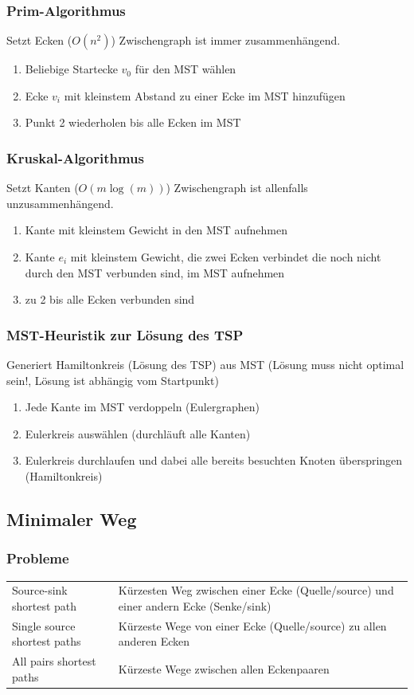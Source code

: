 \subsubsection{Prim-Algorithmus}
Setzt Ecken ($O(n^2)$) Zwischengraph ist immer zusammenhängend.
\begin{enumerate}
	\item Beliebige Startecke $v_0$ für den MST wählen
	\item Ecke $v_i$ mit kleinstem Abstand zu einer Ecke im MST hinzufügen
	\item Punkt 2 wiederholen bis alle Ecken im MST
\end{enumerate}


\subsubsection{Kruskal-Algorithmus}
Setzt Kanten ($O(m \log(m))$) Zwischengraph ist allenfalls unzusammenhängend.
\begin{enumerate}
	\item Kante mit kleinstem Gewicht in den MST aufnehmen
	\item Kante $e_i$ mit kleinstem Gewicht, die zwei Ecken verbindet die noch nicht durch den MST verbunden sind, im MST aufnehmen
	\item zu 2 bis alle Ecken verbunden sind
\end{enumerate}


\subsubsection{MST-Heuristik zur Lösung des TSP}
Generiert Hamiltonkreis (Lösung des TSP) aus MST (Lösung muss nicht optimal sein!, Lösung ist abhängig vom Startpunkt)

\begin{enumerate}
	\item Jede Kante im MST verdoppeln (Eulergraphen)
	\item Eulerkreis auswählen (durchläuft alle Kanten)
	\item Eulerkreis durchlaufen und dabei alle bereits besuchten Knoten überspringen (Hamiltonkreis)
\end{enumerate}


\subsection{Minimaler Weg}

\subsubsection{Probleme}
    \begin{tabular}{ll}
      Source-sink shortest path
        & Kürzesten Weg zwischen einer Ecke (Quelle/source) und einer andern Ecke (Senke/sink) \\
      Single source shortest paths
        & Kürzeste Wege von einer Ecke (Quelle/source) zu allen anderen Ecken \\
      All pairs shortest paths
        & Kürzeste Wege zwischen allen Eckenpaaren\\
    \end{tabular}
